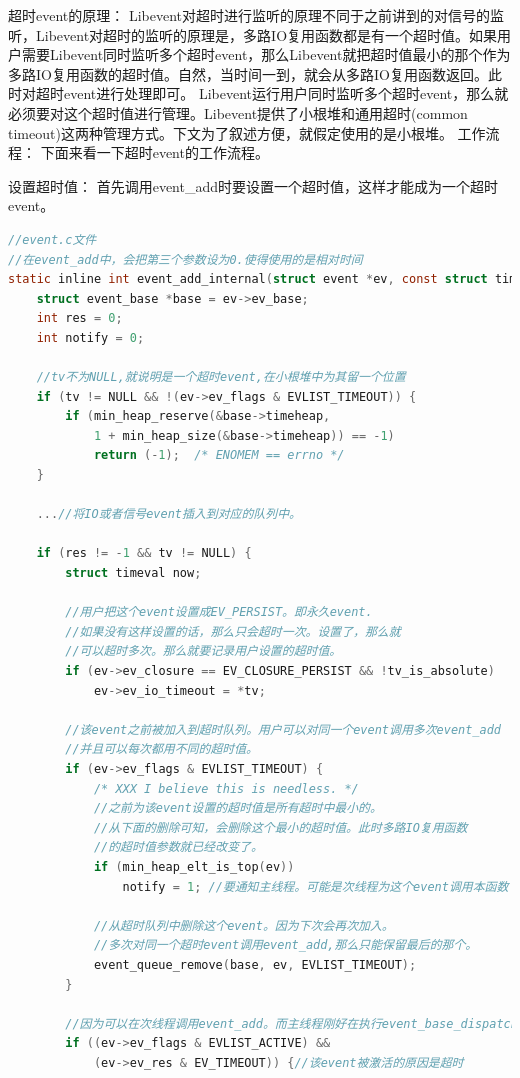 \documentclass[11pt,a4paper]{article}
\begin{document}
超时event的原理：
        Libevent对超时进行监听的原理不同于之前讲到的对信号的监听，Libevent对超时的监听的原理是，多路IO复用函数都是有一个超时值。如果用户需要Libevent同时监听多个超时event，那么Libevent就把超时值最小的那个作为多路IO复用函数的超时值。自然，当时间一到，就会从多路IO复用函数返回。此时对超时event进行处理即可。
Libevent运行用户同时监听多个超时event，那么就必须要对这个超时值进行管理。Libevent提供了小根堆和通用超时(common timeout)这两种管理方式。下文为了叙述方便，就假定使用的是小根堆。
工作流程：
        下面来看一下超时event的工作流程。

设置超时值：
        首先调用event\_add时要设置一个超时值，这样才能成为一个超时event。
\begin{lstlisting}[language=C]
//event.c文件
//在event_add中，会把第三个参数设为0.使得使用的是相对时间
static inline int event_add_internal(struct event *ev, const struct timeval *tv, int tv_is_absolute) {
	struct event_base *base = ev->ev_base;
	int res = 0;
	int notify = 0;

	//tv不为NULL,就说明是一个超时event,在小根堆中为其留一个位置
	if (tv != NULL && !(ev->ev_flags & EVLIST_TIMEOUT)) {
		if (min_heap_reserve(&base->timeheap,
			1 + min_heap_size(&base->timeheap)) == -1)
			return (-1);  /* ENOMEM == errno */
	}

	...//将IO或者信号event插入到对应的队列中。

	if (res != -1 && tv != NULL) {
		struct timeval now;

		//用户把这个event设置成EV_PERSIST。即永久event.
		//如果没有这样设置的话，那么只会超时一次。设置了，那么就
		//可以超时多次。那么就要记录用户设置的超时值。
		if (ev->ev_closure == EV_CLOSURE_PERSIST && !tv_is_absolute)
			ev->ev_io_timeout = *tv;

		//该event之前被加入到超时队列。用户可以对同一个event调用多次event_add
		//并且可以每次都用不同的超时值。
		if (ev->ev_flags & EVLIST_TIMEOUT) {
			/* XXX I believe this is needless. */
			//之前为该event设置的超时值是所有超时中最小的。
			//从下面的删除可知，会删除这个最小的超时值。此时多路IO复用函数
			//的超时值参数就已经改变了。
			if (min_heap_elt_is_top(ev))
				notify = 1; //要通知主线程。可能是次线程为这个event调用本函数

			//从超时队列中删除这个event。因为下次会再次加入。
			//多次对同一个超时event调用event_add,那么只能保留最后的那个。
			event_queue_remove(base, ev, EVLIST_TIMEOUT);
		}

		//因为可以在次线程调用event_add。而主线程刚好在执行event_base_dispatch
		if ((ev->ev_flags & EVLIST_ACTIVE) &&
		    (ev->ev_res & EV_TIMEOUT)) {//该event被激活的原因是超时
			

\end{lstlisting}
\end{document}
